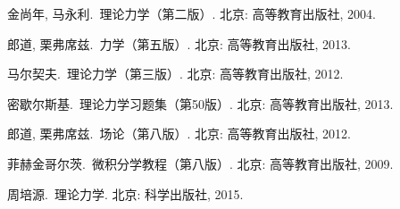 \begin{thebibliography}{9}

{金尚年, 马永利.}\, 理论力学（第二版）. 北京: 高等教育出版社, 2004.

{郎道, 栗弗席兹.}\, 力学（第五版）. 北京: 高等教育出版社, 2013.

{马尔契夫.}\, 理论力学（第三版）. 北京: 高等教育出版社, 2012.

{密歇尔斯基.}\, 理论力学习题集（第50版）. 北京: 高等教育出版社, 2013.

{郎道, 栗弗席兹.}\, 场论（第八版）. 北京: 高等教育出版社, 2012.

{菲赫金哥尔茨.}\, 微积分学教程（第八版）. 北京: 高等教育出版社, 2009.

{周培源.}\, 理论力学. 北京: 科学出版社, 2015.

\end{thebibliography}
